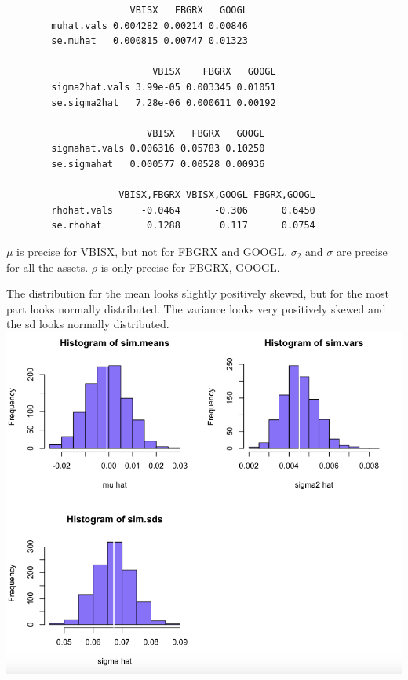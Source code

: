 \documentclass[letterpaper,12pt]{article}
\begin{document}
\begin{enumerate}

        \begin{lstlisting}
                      VBISX   FBGRX   GOOGL
        muhat.vals 0.004282 0.00214 0.00846
        se.muhat   0.000815 0.00747 0.01323
        
                          VBISX    FBGRX   GOOGL
        sigma2hat.vals 3.99e-05 0.003345 0.01051
        se.sigma2hat   7.28e-06 0.000611 0.00192
        
                         VBISX   FBGRX   GOOGL
        sigmahat.vals 0.006316 0.05783 0.10250
        se.sigmahat   0.000577 0.00528 0.00936
        
                    VBISX,FBGRX VBISX,GOOGL FBGRX,GOOGL
        rhohat.vals     -0.0464      -0.306      0.6450
        se.rhohat        0.1288       0.117      0.0754
        \end{lstlisting}
        
	$\mu$ is precise for VBISX, but not for FBGRX and GOOGL. $\sigma_2$ and $\sigma$ are precise for all the assets. $\rho$ is only precise for FBGRX, GOOGL.

The distribution for the mean looks slightly positively skewed, but for the most part looks normally distributed. The variance looks very positively skewed and the sd looks normally distributed. \\ 
\includegraphics[scale= 0.5]{Histograms} 


\end{enumerate}
\end{document}
